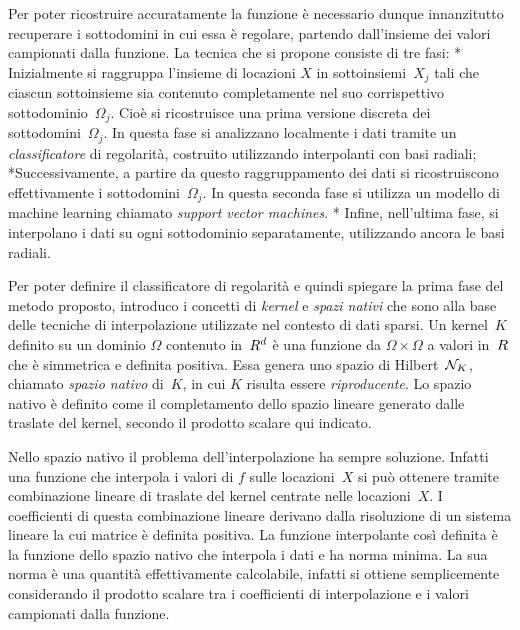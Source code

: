 Per poter ricostruire accuratamente la funzione è necessario dunque innanzitutto  recuperare i sottodomini in cui essa è regolare, partendo dall'insieme dei valori campionati dalla funzione.  La tecnica che si propone consiste di tre fasi:
\begitems
* Inizialmente si raggruppa l'insieme di locazioni $X$ in sottoinsiemi~$X_j$ tali che ciascun sottoinsieme sia contenuto completamente nel suo corrispettivo sottodominio~$\Omega_j$.  Cioè si ricostruisce una prima versione discreta dei sottodomini~$\Omega_j$.   In questa fase si analizzano localmente i dati tramite un {\em classificatore} di regolarità, costruito utilizzando interpolanti con basi radiali;
*Successivamente, a partire da questo raggruppamento dei dati si ricostruiscono effettivamente i sottodomini~$\Omega_j$.  In questa seconda fase si utilizza un modello di machine learning chiamato {\em support vector machines}.
* Infine, nell'ultima fase, si interpolano i dati su ogni sottodominio separatamente, utilizzando ancora le basi radiali.
\enditems


Per poter definire il classificatore di regolarità e quindi spiegare la prima fase del metodo proposto, introduco i concetti di {\em kernel} e {\em spazi nativi} che sono alla base delle tecniche di interpolazione utilizzate nel contesto di dati sparsi.
Un kernel~$K$ definito su un dominio $\Omega$ contenuto in~$R^d$ è una funzione da $\Omega{\times}\Omega$ a valori in~$R$ che è simmetrica e definita positiva.  Essa genera uno spazio di Hilbert~${\cal N}_K$, chiamato {\em spazio nativo} di~$K$, in cui $K$ risulta essere {\em riproducente}.
Lo spazio nativo è definito come il completamento dello spazio lineare generato dalle traslate del kernel, secondo il prodotto scalare qui  indicato.

Nello spazio nativo il problema dell'interpolazione ha sempre soluzione.  Infatti una funzione che interpola i valori di $f$ sulle locazioni~$X$ si può ottenere tramite combinazione lineare di traslate del kernel centrate nelle locazioni~$X$.   I coefficienti di questa combinazione lineare derivano dalla risoluzione di un sistema lineare la cui matrice è definita positiva.
  La funzione interpolante così definita è la funzione dello spazio nativo che interpola i dati e ha norma minima.  
 La sua norma  è una quantità effettivamente calcolabile, infatti si ottiene semplicemente considerando il prodotto scalare tra i coefficienti di interpolazione e i valori campionati dalla funzione.





